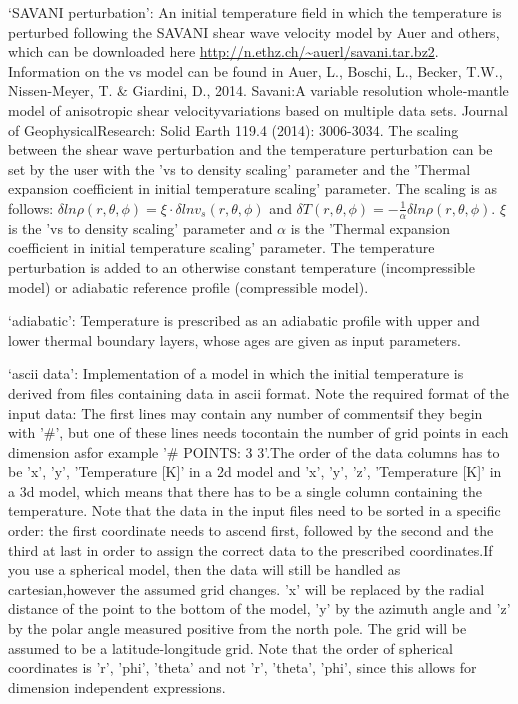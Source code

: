 \begin{itemize}
`SAVANI perturbation': An initial temperature field in which the temperature is perturbed following the SAVANI shear wave velocity model by Auer and others, which can be downloaded here \url{http://n.ethz.ch/~auerl/savani.tar.bz2}. Information on the vs model can be found in Auer, L., Boschi, L., Becker, T.W., Nissen-Meyer, T. \& Giardini, D., 2014. Savani:A variable resolution whole‐mantle model of anisotropic shear velocityvariations based on multiple data sets. Journal of GeophysicalResearch: Solid Earth 119.4 (2014): 3006-3034. The scaling between the shear wave perturbation and the temperature perturbation can be set by the user with the 'vs to density scaling' parameter and the 'Thermal expansion coefficient in initial temperature scaling' parameter. The scaling is as follows: $\delta ln \rho (r,\theta,\phi) = \xi \cdot \delta ln v_s(r,\theta, \phi)$ and $\delta T(r,\theta,\phi) = - \frac{1}{\alpha} \delta ln \rho(r,\theta,\phi)$. $\xi$ is the 'vs to density scaling' parameter and $\alpha$ is the 'Thermal expansion coefficient in initial temperature scaling' parameter. The temperature perturbation is added to an otherwise constant temperature (incompressible model) or adiabatic reference profile (compressible model).

`adiabatic': Temperature is prescribed as an adiabatic profile with upper and lower thermal boundary layers, whose ages are given as input parameters.

`ascii data': Implementation of a model in which the initial temperature is derived from files containing data in ascii format. Note the required format of the input data: The first lines may contain any number of commentsif they begin with '#', but one of these lines needs tocontain the number of grid points in each dimension asfor example '# POINTS: 3 3'.The order of the data columns has to be 'x', 'y', 'Temperature [K]' in a 2d model and  'x', 'y', 'z', 'Temperature [K]' in a 3d model, which means that there has to be a single column containing the temperature. Note that the data in the input files need to be sorted in a specific order: the first coordinate needs to ascend first, followed by the second and the third at last in order to assign the correct data to the prescribed coordinates.If you use a spherical model, then the data will still be handled as cartesian,however the assumed grid changes. 'x' will be replaced by the radial distance of the point to the bottom of the model, 'y' by the azimuth angle and 'z' by the polar angle measured positive from the north pole. The grid will be assumed to be a latitude-longitude grid. Note that the order of spherical coordinates is 'r', 'phi', 'theta' and not 'r', 'theta', 'phi', since this allows for dimension independent expressions. 


\end{itemize}
